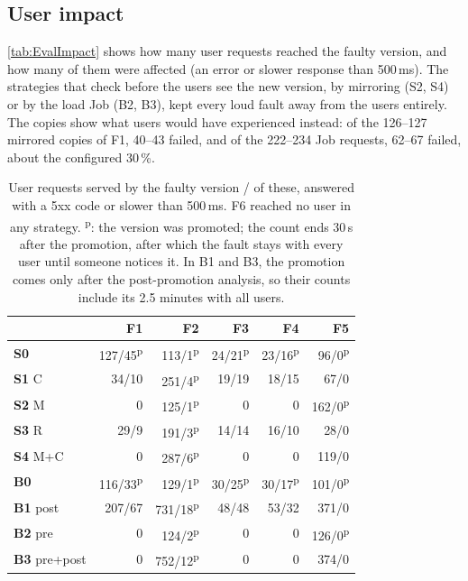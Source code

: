 \subsection{User impact}
\label{sec:EvalImpact}
\autoref{tab:EvalImpact} shows how many user requests reached the faulty version, and how many of them were affected (an error or slower response than 500\,ms). The strategies that check before the users see the new version, by mirroring (S2, S4) or by the load Job (B2, B3), kept every loud fault away from the users entirely. The copies show what users would have experienced instead: of the 126--127 mirrored copies of F1, 40--43 failed, and of the 222--234 Job requests, 62--67 failed, about the configured 30\,\%.

\begin{table}[ht]
	\footnotesize
	\centering
	\begin{tabular}{ l r r r r r }
		\toprule
		& F1 & F2 & F3 & F4 & F5 \\
		\midrule
		\textbf{S0} & 127/45\textsuperscript{p} & 113/1\textsuperscript{p} & 24/21\textsuperscript{p} & 23/16\textsuperscript{p} & 96/0\textsuperscript{p} \\
		\textbf{S1} C & 34/10 & 251/4\textsuperscript{p} & 19/19 & 18/15 & 67/0 \\
		\textbf{S2} M & 0 & 125/1\textsuperscript{p} & 0 & 0 & 162/0\textsuperscript{p} \\
		\textbf{S3} R & 29/9 & 191/3\textsuperscript{p} & 14/14 & 16/10 & 28/0 \\
		\textbf{S4} M+C & 0 & 287/6\textsuperscript{p} & 0 & 0 & 119/0 \\
		\midrule
		\textbf{B0} & 116/33\textsuperscript{p} & 129/1\textsuperscript{p} & 30/25\textsuperscript{p} & 30/17\textsuperscript{p} & 101/0\textsuperscript{p} \\
		\textbf{B1} post & 207/67 & 731/18\textsuperscript{p} & 48/48 & 53/32 & 371/0 \\
		\textbf{B2} pre & 0 & 124/2\textsuperscript{p} & 0 & 0 & 126/0\textsuperscript{p} \\
		\textbf{B3} pre+post & 0 & 752/12\textsuperscript{p} & 0 & 0 & 374/0 \\
		\bottomrule
	\end{tabular}
	\caption{User requests served by the faulty version / of these, answered with a 5xx code or slower than 500\,ms. F6 reached no user in any strategy. \textsuperscript{p}: the version was promoted; the count ends 30\,s after the promotion, after which the fault stays with every user until someone notices it. In B1 and B3, the promotion comes only after the post-promotion analysis, so their counts include its 2.5 minutes with all users.}
	\label{tab:EvalImpact}
\end{table}

